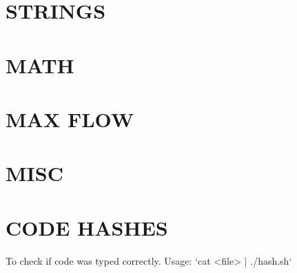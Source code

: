 \documentclass[12pt,letterpaper,twocolumn,landscape]{article}
\begin{document}
\section{STRINGS}








\section{MATH}











\section{MAX FLOW}




\section{MISC}






\section{CODE HASHES}
To check if code was typed correctly. Usage: `cat <file> | ./hash.sh`



\pagebreak
\end{document}
